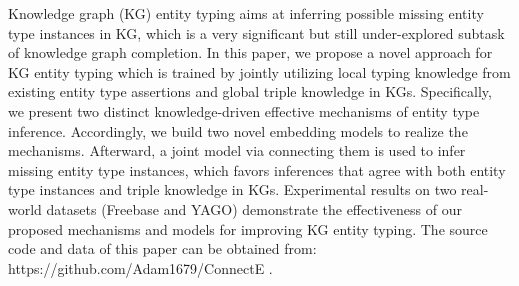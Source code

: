Knowledge graph (KG) entity typing aims at inferring possible missing entity type instances in KG, which is a very significant but still under-explored subtask of knowledge graph completion. In this paper, we propose a novel approach for KG entity typing which is trained by jointly utilizing local typing knowledge from existing entity type assertions and global triple knowledge in KGs. Specifically, we present two distinct knowledge-driven effective mechanisms of entity type inference. Accordingly, we build two novel embedding models to realize the mechanisms. Afterward, a joint model via connecting them is used to infer missing entity type instances, which favors inferences that agree with both entity type instances and triple knowledge in KGs. Experimental results on two real-world datasets (Freebase and YAGO) demonstrate the effectiveness of our proposed mechanisms and models for improving KG entity typing. The source code and data of this paper can be obtained from: https://github.com/Adam1679/ConnectE .
